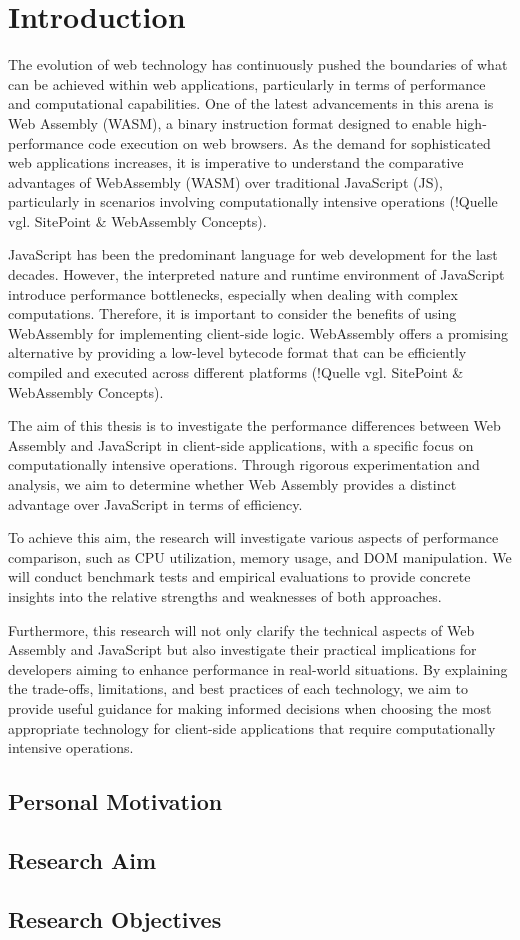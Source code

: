 \newpage

\section{Introduction} \label{introduction}
The evolution of web technology has continuously pushed the boundaries of what can be achieved within web applications, particularly in terms of performance and computational capabilities. One of the latest advancements in this arena is Web Assembly (WASM), a binary instruction format designed to enable high-performance code execution on web browsers. As the demand for sophisticated web applications increases, it is imperative to understand the comparative advantages of WebAssembly (WASM) over traditional JavaScript (JS), particularly in scenarios involving computationally intensive operations (!Quelle vgl. SitePoint \& WebAssembly Concepts).

JavaScript has been the predominant language for web development for the last decades. However, the interpreted nature and runtime environment of JavaScript introduce performance bottlenecks, especially when dealing with complex computations. Therefore, it is important to consider the benefits of using WebAssembly for implementing client-side logic. WebAssembly offers a promising alternative by providing a low-level bytecode format that can be efficiently compiled and executed across different platforms (!Quelle vgl. SitePoint \& WebAssembly Concepts).

The aim of this thesis is to investigate the performance differences between Web Assembly and JavaScript in client-side applications, with a specific focus on computationally intensive operations. Through rigorous experimentation and analysis, we aim to determine whether Web Assembly provides a distinct advantage over JavaScript in terms of efficiency.

To achieve this aim, the research will investigate various aspects of performance comparison, such as CPU utilization, memory usage, and DOM manipulation. We will conduct benchmark tests and empirical evaluations to provide concrete insights into the relative strengths and weaknesses of both approaches.

Furthermore, this research will not only clarify the technical aspects of Web Assembly and JavaScript but also investigate their practical implications for developers aiming to enhance performance in real-world situations. By explaining the trade-offs, limitations, and best practices of each technology, we aim to provide useful guidance for making informed decisions when choosing the most appropriate technology for client-side applications that require computationally intensive operations.

\subsection{Personal Motivation} \label{motivation}

\subsection{Research Aim} \label{aim}

\subsection{Research Objectives} \label{objectives}
